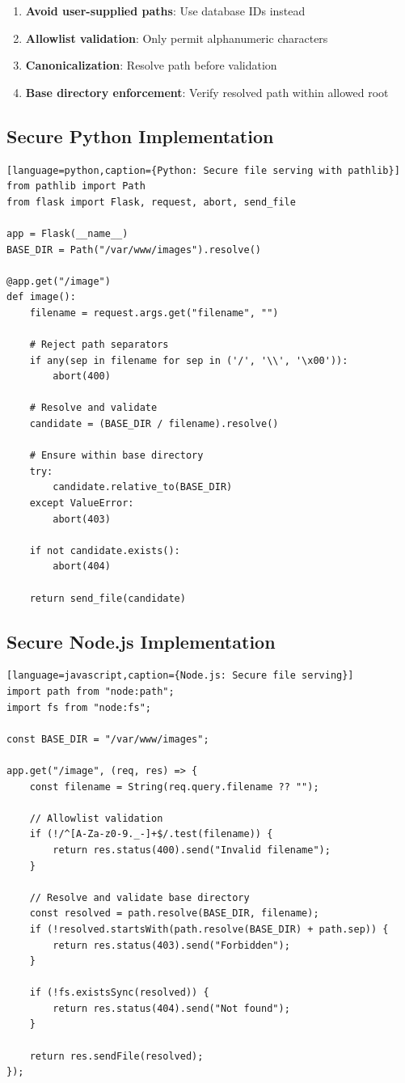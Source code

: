\documentclass[11pt,letterpaper]{article}
\begin{document}
\begin{enumerate}
  \item \textbf{Avoid user-supplied paths}: Use database IDs instead
  \item \textbf{Allowlist validation}: Only permit alphanumeric characters
  \item \textbf{Canonicalization}: Resolve path before validation
  \item \textbf{Base directory enforcement}: Verify resolved path within allowed root
\end{enumerate}

\subsection{Secure Python Implementation}

\begin{verbatim}[language=python,caption={Python: Secure file serving with pathlib}]
from pathlib import Path
from flask import Flask, request, abort, send_file

app = Flask(__name__)
BASE_DIR = Path("/var/www/images").resolve()

@app.get("/image")
def image():
    filename = request.args.get("filename", "")

    # Reject path separators
    if any(sep in filename for sep in ('/', '\\', '\x00')):
        abort(400)

    # Resolve and validate
    candidate = (BASE_DIR / filename).resolve()

    # Ensure within base directory
    try:
        candidate.relative_to(BASE_DIR)
    except ValueError:
        abort(403)

    if not candidate.exists():
        abort(404)

    return send_file(candidate)
\end{verbatim}

\subsection{Secure Node.js Implementation}

\begin{verbatim}[language=javascript,caption={Node.js: Secure file serving}]
import path from "node:path";
import fs from "node:fs";

const BASE_DIR = "/var/www/images";

app.get("/image", (req, res) => {
    const filename = String(req.query.filename ?? "");

    // Allowlist validation
    if (!/^[A-Za-z0-9._-]+$/.test(filename)) {
        return res.status(400).send("Invalid filename");
    }

    // Resolve and validate base directory
    const resolved = path.resolve(BASE_DIR, filename);
    if (!resolved.startsWith(path.resolve(BASE_DIR) + path.sep)) {
        return res.status(403).send("Forbidden");
    }

    if (!fs.existsSync(resolved)) {
        return res.status(404).send("Not found");
    }

    return res.sendFile(resolved);
});
\end{verbatim}
\end{document}
